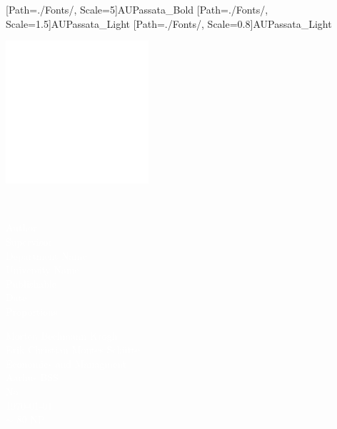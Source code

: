 
\thispagestyle{empty}

\pagecolor{AUdefault}\afterpage{\nopagecolor}
 
\newfontfamily{\AUPB}[Path=./Fonts/, Scale=5]{AUPassata_Bold}
\newfontfamily{\AUPL}[Path=./Fonts/, Scale=1.5]{AUPassata_Light}
\newfontfamily{\AUPLSmall}[Path=./Fonts/, Scale=0.8]{AUPassata_Light}



{\includegraphics[width=200px, left]{Figures/Logos/AarhusBSSlogo_neg_square.eps} }



\vspace{1.5cm}


{\raggedleft{\AUPB \textcolor{white}{
Reinforcing Neural Network's for Credit Default's prediction}}} \\

\vspace{1.5cm}

\begin{minipage}[c]{0.5\textwidth}
\raggedright{\AUPL \textcolor{white}{ 
       Author \\
       Supervisor\\
       Department Name\\
       University Name\\
       Publishable\\
       Date\\
       Proportions
       }}
\end{minipage}%
\begin{minipage}[d]{0.5\textwidth}
\raggedright{\AUPL \textcolor{white}{ 
       Morten Bechmann Krogh\\
       Erik Christian Montes Schütte\\
       Economics and Managment\\
       Aarhus BSS\\
       No\\
       \today\\
       $\sim$ 80 NP
       }}
\end{minipage}%

